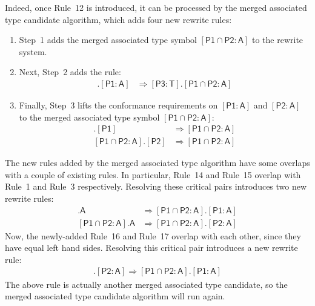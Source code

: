 \documentclass[headsepline,bibliography=totoc]{scrreport}
\newcommand{\namesym}[1]{\mathsf{#1}}
\newcommand{\proto}[1]{\bm{\mathsf{#1}}}
\newcommand{\protosym}[1]{[\proto{#1}]}
\newcommand{\assocsym}[2]{[\proto{#1}\colon\namesym{#2}]}
\theoremstyle{definition}
\theoremstyle{definition}
\theoremstyle{definition}
\begin{document}
Indeed, once Rule~12 is introduced, it can be processed by the merged associated type candidate algorithm, which adds four new rewrite rules:
\begin{enumerate}
\item Step~1 adds the merged associated type symbol $[\proto{P1}\cap\proto{P2}\colon\namesym{A}]$ to the rewrite system.

\item Next, Step~2 adds the rule:
\begin{align}
\assocsym{P3}{T}.\assocsym{P1}{A}&\Rightarrow\assocsym{P3}{T}.[\proto{P1}\cap\proto{P2}\colon\namesym{A}]\tag{13}
\end{align}

\item Finally, Step~3 lifts the conformance requirements on $\assocsym{P1}{A}$ and $\assocsym{P2}{A}$ to the merged associated type symbol $[\proto{P1}\cap\proto{P2}\colon\namesym{A}]$:
\begin{align*}
[\proto{P1}\cap\proto{P2}\colon\namesym{A}].\protosym{P1}&\Rightarrow [\proto{P1}\cap\proto{P2}\colon\namesym{A}]\tag{14}\\
[\proto{P1}\cap\proto{P2}\colon\namesym{A}].\protosym{P2}&\Rightarrow [\proto{P1}\cap\proto{P2}\colon\namesym{A}]\tag{15}
\end{align*}

\end{enumerate}
The new rules added by the merged associated type algorithm have some overlaps with a couple of existing rules. In particular, Rule~14 and Rule~15 overlap with Rule~1 and Rule~3 respectively. Resolving these critical pairs introduces two new rewrite rules:
\begin{align}
[\proto{P1}\cap\proto{P2}\colon\namesym{A}].\namesym{A}&\Rightarrow[\proto{P1}\cap\proto{P2}\colon\namesym{A}].\assocsym{P1}{A}\tag{16}\\
[\proto{P1}\cap\proto{P2}\colon\namesym{A}].\namesym{A}&\Rightarrow[\proto{P1}\cap\proto{P2}\colon\namesym{A}].\assocsym{P2}{A}\tag{17}
\end{align}
Now, the newly-added Rule~16 and Rule~17 overlap with each other, since they have equal left hand sides. Resolving this critical pair introduces a new rewrite rule:
\begin{align}
[\proto{P1}\cap\proto{P2}\colon\namesym{A}].\assocsym{P2}{A}\Rightarrow [\proto{P1}\cap\proto{P2}\colon\namesym{A}].\assocsym{P1}{A}\tag{18}
\end{align}
The above rule is actually another merged associated type candidate, so the merged associated type candidate algorithm will run again.
\end{document}
